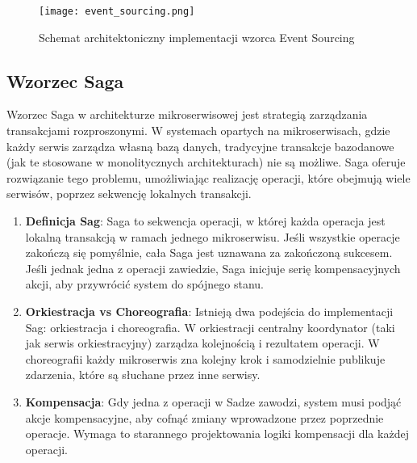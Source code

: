 \begin{figure}[!h]
    \centering \texttt{[image: event\_sourcing.png]}
    \caption{Schemat architektoniczny implementacji wzorca Event Sourcing}
\end{figure}

\subsection{Wzorzec Saga}

Wzorzec Saga \cite{saga} w architekturze mikroserwisowej jest strategią zarządzania transakcjami rozproszonymi. W systemach opartych na mikroserwisach, gdzie każdy serwis zarządza własną bazą danych, tradycyjne transakcje bazodanowe (jak te stosowane w monolitycznych architekturach) nie są możliwe. Saga oferuje rozwiązanie tego problemu, umożliwiając realizację operacji, które obejmują wiele serwisów, poprzez sekwencję lokalnych transakcji.

\begin{enumerate}

    \item \textbf{Definicja Sag}: Saga to sekwencja operacji, w której każda operacja jest lokalną transakcją w ramach jednego mikroserwisu. Jeśli wszystkie operacje zakończą się pomyślnie, cała Saga jest uznawana za zakończoną sukcesem. Jeśli jednak jedna z operacji zawiedzie, Saga inicjuje serię kompensacyjnych akcji, aby przywrócić system do spójnego stanu.

    \item \textbf{Orkiestracja vs Choreografia}: Istnieją dwa podejścia do implementacji Sag: orkiestracja i choreografia. W orkiestracji centralny koordynator (taki jak serwis orkiestracyjny) zarządza kolejnością i rezultatem operacji. W choreografii każdy mikroserwis zna kolejny krok i samodzielnie publikuje zdarzenia, które są słuchane przez inne serwisy.

    \item \textbf{Kompensacja}: Gdy jedna z operacji w Sadze zawodzi, system musi podjąć akcje kompensacyjne, aby cofnąć zmiany wprowadzone przez poprzednie operacje. Wymaga to starannego projektowania logiki kompensacji dla każdej operacji.

\end{enumerate}
